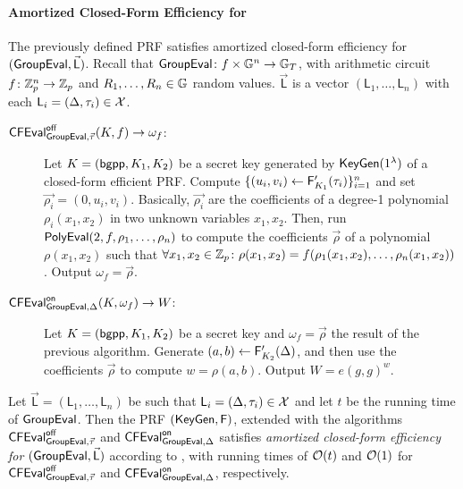 \paragraph*{Amortized Closed-Form Efficiency for \GroupEval} The previously
defined PRF satisfies amortized closed-form efficiency for $(\GroupEval,
\vec{\mathsf{L}})$. Recall that $\function{\GroupEval}{f \times
\bbG^n}{\bbG_T}$, with arithmetic circuit $\function{f}{\bbZ^n_p}{\bbZ_p}$ and
$R_1, \dotsc, R_n \in \mathbb{G}$ random values. $\vec{\mathsf{L}}$ is a vector
$(\mathsf{L}_1, \dotsc, \mathsf{L}_n)$ with each $\mathsf{L}_i = (\Delta,
\tau_i) \in \mathcal{X}$.
\begin{description}
  \item[$\CFEval^\off_{\GroupEval, \vec{\tau}}(K, f) \to \omega_f$:]
    Let $K = (\bgpp, K_1, K_2)$ be a secret key generated by
    $\KeyGen(1^\lambda)$ of a closed-form efficient PRF. Compute $\{(u_i, v_i)
      \gets \F'_{K_1}(\tau_i)\}_{i=1}^{n}$ and set $\vec{\rho_i} = (0,
      u_i, v_i)$. Basically, $\vec{\rho_i}$ are the coefficients of a degree-1
      polynomial $\rho_i(x_1, x_2)$ in two unknown variables $x_1, x_2$. Then,
      run $\PolyEval(2, f, \rho_1, \dotsc, \rho_n)$ to compute the coefficients
      $\vec{\rho}$ of a polynomial $\rho(x_1, x_2)$ such that $\forall x_1, x_2
      \in \mathbb{Z}_p \colon \rho(x_1, x_2) = f(\rho_1(x_1, x_2), \dotsc,
      \rho_n(x_1, x_2))$. Output $\omega_f = \vec{\rho}$.
  \item[$\CFEval^\on_{\GroupEval, \Delta}(K, \omega_f) \to W$:] Let $K
    = (\bgpp, K_1, K_2)$ be a secret key and $\omega_f = \vec{\rho}$ the result
    of the previous algorithm. Generate $(a,b) \gets \F'_{K_2}(\Delta)$,
    and then use the coefficients $\vec{\rho}$ to compute $w = \rho(a,b)$.
    Output $W = e(g, g)^w$.
\end{description}

\begin{theorem}
  Let $\vec{\mathsf{L}} = (\mathsf{L}_1, \dotsc, \mathsf{L}_n)$ be such that
  $\mathsf{L}_i = (\Delta, \tau_i) \in \mathcal{X}$ and let $t$ be the running time
  of $\GroupEval$. Then the PRF $(\KeyGen, \F)$, extended with the algorithms
  $\CFEval^\off_{\GroupEval, \vec{\tau}}$ and $\CFEval^\on_{\GroupEval,
  \Delta}$ satisfies \emph{amortized closed-form efficiency for $(\GroupEval,
    \vec{\mathsf{L}})$} according to , with running
    times of $\mathcal{O}(t)$ and $\mathcal{O}(1)$ for $\CFEval^\off_{\GroupEval,
      \vec{\tau}}$ and $\CFEval^\on_{\GroupEval, \Delta}$, respectively.
  \label{theo:amort-closed-form-group-eval}
\end{theorem}

